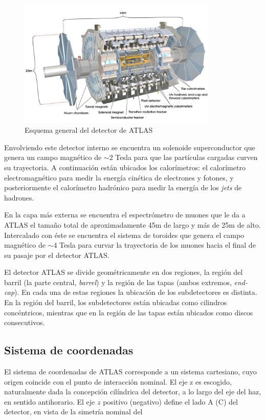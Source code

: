 \begin{figure}[H]
  \centering
  \includegraphics[width=0.85\textwidth]{figures/atlas}
  \caption{Esquema general del detector de ATLAS}\label{fig:atlas}
\end{figure}


Envolviendo este detector interno se encuentra un solenoide superconductor que
genera un campo magnético de $\sim$2 Tesla para que las partículas cargadas
curven su trayectoria. A continuación están ubicados los calorímetros: el
calorímetro electromagnético para medir la energía cinética de electrones y
fotones, y posteriormente el calorímetro hadrónico para medir la energía de los
\emph{jets} de hadrones.

En la capa más externa se encuentra el espectrómetro de muones que le da a ATLAS
el tamaño total de aproximadamente 45m de largo y más de 25m de alto.
Intercalado con éste se encuentra el sistema de toroides que genera el campo
magnético de $\sim$4 Tesla para curvar la trayectoria de los muones hacia el
final de su pasaje por el detector ATLAS.

El detector ATLAS se divide geométricamente en dos regiones, la región del
barril (la parte central, \emph{barrel}) y la región de las tapas (ambos
extremos, \emph{end-cap}). En cada una de estas regiones la ubicación de los
subdetectores es distinta. En la región del barril, los subdetectores están
ubicadas como cilindros concéntricos, mientras que en la región de las tapas
están ubicados como discos consecutivos.

\subsection{Sistema de coordenadas}

El sistema de coordenadas de ATLAS corresponde a un sistema cartesiano, cuyo
origen coincide con el punto de interacción nominal. El eje z es escogido,
naturalmente dada la concepción cilíndrica del detector, a lo largo del eje del
haz, en sentido antihorario. El eje $z$ positivo (negativo) define el lado A (C)
del detector, en vista de la simetría nominal del

